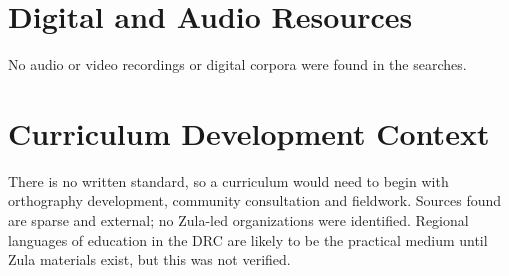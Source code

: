 \documentclass[12pt]{article}
\begin{document}
\section{Digital and Audio Resources}
No audio or video recordings or digital corpora were found in the searches.

\section{Curriculum Development Context}
There is no written standard, so a curriculum would need to begin with orthography development, community consultation and fieldwork. Sources found are sparse and external; no Zula-led organizations were identified. Regional languages of education in the DRC are likely to be the practical medium until Zula materials exist, but this was not verified.
\end{document}
